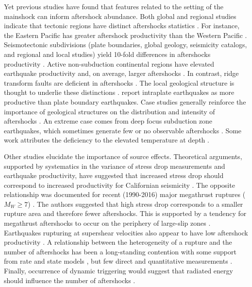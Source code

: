 \documentclass[draft, jgrga]{agujournal2018}
\begin{document}
Yet previous studies have found that features related to the setting of the mainshock can inform aftershock abundance. Both global and regional studies indicate that tectonic regions have distinct aftershocks statistics \citep{Chu2011, Page, Davidsen2015GeneralizedCalifornia, Tahir2014Aftershock2005, ogata2017statistics}. For instance, the Eastern Pacific has greater aftershock productivity than the Western Pacific \citep{Singh1911, Wetzler2016}. Seismotectonic subdivisions (plate boundaries, global geology, seismicity catalogs, and regional and local studies) yield 10-fold differences in aftershocks productivity \citep{Page}. Active non-subduction continental regions have elevated earthquake productivity and, on average, larger aftershocks \citep{Page, Mogi1967, Davis1991Single-linkVariations}. In contrast, ridge transform faults are deficient in aftershocks \citep{Davis1991Single-linkVariations, Boettcher2004EarthquakeFaults, McGuire2005}. The local geological structure is thought to underlie these distinctions \citep{Boettcher2004EarthquakeFaults, McCloskey2003StructuralAftershocks}. \citet{Yamanaka1990scalingshock} report intraplate earthquakes as more productive than plate boundary earthquakes. \citet{Zaliapin2016AClusters}  Case studies generally reinforce the importance of geological structures on the distribution and intensity of aftershocks \citep{Das2003SpatialDistribution, McCloskey2003StructuralAftershocks}. An extreme case comes from deep focus subduction zone earthquakes, which sometimes generate few or no observable aftershocks \citep{Bath1965LateralMantle, Frohlich1989TheEarthquakes, Nyffenegger2000, Wiens1997AftershockZone, Wu1999, Houston2004}. Some work attributes the deficiency to the elevated temperature at depth \citep{Nyffenegger2000, Houston2004}. 

Other studies elucidate the importance of source effects. Theoretical arguments, supported by systematics in the variance of stress drop measurements and earthquake productivity, have suggested that increased stress drop should correspond to increased productivity for Californian seismicity \citep{Marsan2017HowAftershocks}. The opposite relationship was documented for recent (1990-2016) major megathrust ruptures ($M_W \ge 7$) \citep{Wetzler2016}. The authors suggested that high stress drop corresponds to a smaller rupture area and therefore fewer aftershocks. This is supported by a tendency for megathrust aftershocks to occur on the periphery of large-slip zones \citep{Wetzler2016}. Earthquakes rupturing at supershear velocities also appear to have low aftershock productivity \citep{Bouchon2008TheEarthquakes}. A relationship between the heterogeneity of a rupture and the number of aftershocks has been a long-standing contention \citep{Mogi1967, Yamanaka1990scalingshock} with some support from rate and state models \citep{Helmstetter2006RelationModel, Marsan2006}, but few direct and quantitative measurements \citep{Das2003SpatialDistribution, Houston2004}. Finally, occurrence of dynamic triggering would suggest that radiated energy should influence the number of aftershocks \citep{felzer2006decay}.  
\end{document}
